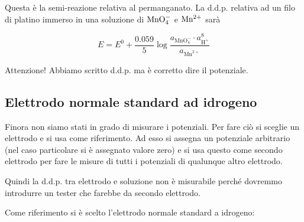 Questa è la semi-reazione relativa al permanganato. La d.d.p. relativa ad un filo di platino immerso in una soluzione di $\rm MnO_4^-$ e $\rm Mn^{2+}$ sarà

$$E = E^0 + \frac{0.059}{5} \log \frac{a_{\text{MnO}_4^-} \cdot a^8_{\text{H}^+}}{a_{\text{Mn}^{2+}}}$$

Attenzione! Abbiamo scritto d.d.p. ma è corretto dire il potenziale.
\subsection{Elettrodo normale standard ad idrogeno}
Finora non siamo stati in grado di misurare i potenziali. Per fare ciò si sceglie un elettrodo e si usa come riferimento. Ad esso si assegna un potenziale arbitrario (nel caso particolare si è assegnato valore zero) e si usa questo come secondo elettrodo per fare le misure di tutti i potenziali di qualunque altro elettrodo.

Quindi la d.d.p. tra elettrodo e soluzione non è misurabile perché dovremmo introdurre un tester che farebbe da secondo elettrodo.

Come riferimento si è scelto l'elettrodo normale standard a idrogeno:

